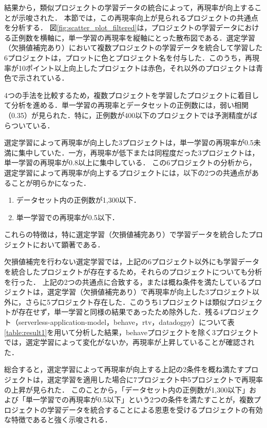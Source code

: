 \documentclass[paper]{ieicej}
\begin{document}
結果から，類似プロジェクトの学習データの統合によって，再現率が向上することが示唆された．
本節では，この再現率向上が見られるプロジェクトの共通点を分析する．
図\ref{fig:scatter_plot_filtered}は，プロジェクトの学習データにおける正例数を横軸に，単一学習の再現率を縦軸にとった散布図である．選定学習（欠損値補完あり）において複数プロジェクトの学習データを統合して学習した6プロジェクトは，プロットに色とプロジェクト名を付与した．このうち，再現率が10ポイント以上向上したプロジェクトは赤色，それ以外のプロジェクトは青色で示されている．

4つの手法を比較するため，複数プロジェクトを学習したプロジェクトに着目して分析を進める．単一学習の再現率とデータセットの正例数には，弱い相関（0.35）が見られた．特に，正例数が400以下のプロジェクトでは予測精度がばらついている．

選定学習によって再現率が向上した3プロジェクトは，単一学習の再現率が0.5未満に集中していた．一方，再現率が低下または同程度だった3プロジェクトは，単一学習の再現率が0.8以上に集中している．
この6プロジェクトの分析から，選定学習によって再現率が向上するプロジェクトには，以下の2つの共通点があることが明らかになった．
\begin{enumerate}
    \item データセット内の正例数が1,300以下．
    \item 単一学習での再現率が0.5以下．
\end{enumerate}
これらの特徴は，特に選定学習（欠損値補完あり）で学習データを統合したプロジェクトにおいて顕著である．

欠損値補完を行わない選定学習では，上記の6プロジェクト以外にも学習データを統合したプロジェクトが存在するため，それらのプロジェクトについても分析を行った．
上記の2つの共通点に合致する，または概ね条件を満たしているプロジェクトは，選定学習（欠損値補完あり）で再現率が向上した3プロジェクト以外に，さらに5プロジェクト存在した．このうち1プロジェクトは類似プロジェクトが存在せず，単一学習と同様の結果であったため除外した．残る4プロジェクト（serverless-application-model，behave，rtv，datadogpy）について表\ref{table:result1}を用いて分析した結果，behaveプロジェクトを除く3プロジェクトでは，選定学習によって変化がないか，再現率が上昇していることが確認された．

総合すると，選定学習によって再現率が向上する上記の2条件を概ね満たすプロジェクトは，選定学習を適用した場合に7プロジェクト中5プロジェクトで再現率の上昇が見られた．
このことから，「データセット内の正例数が1,300以下」および「単一学習での再現率が0.5以下」という2つの条件を満たすことが，複数プロジェクトの学習データを統合することによる恩恵を受けるプロジェクトの有効な特徴であると強く示唆される．
\end{document}
